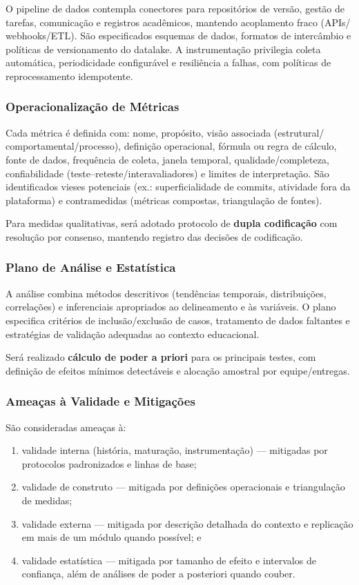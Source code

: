 \documentclass[12pt,a4paper]{article}
\begin{document}
O pipeline de dados contempla conectores para repositórios de versão, gestão de
tarefas, comunicação e registros acadêmicos, mantendo acoplamento fraco (APIs/
webhooks/ETL). São especificados esquemas de dados, formatos de intercâmbio e
políticas de versionamento do datalake. A instrumentação privilegia coleta
automática, periodicidade configurável e resiliência a falhas, com políticas de
reprocessamento idempotente.

\subsubsection{Operacionalização de Métricas}

Cada métrica é definida com: nome, propósito, visão associada (estrutural/
comportamental/processo), definição operacional, fórmula ou regra de cálculo,
fonte de dados, frequência de coleta, janela temporal, qualidade/completeza,
confiabilidade (teste–reteste/interavaliadores) e limites de interpretação.
São identificados vieses potenciais (ex.: superficialidade de commits,
atividade fora da plataforma) e contramedidas (métricas compostas, triangulação
de fontes).

Para medidas qualitativas, será adotado protocolo de \textbf{dupla codificação}
com resolução por consenso, mantendo registro das decisões de codificação.

\subsubsection{Plano de Análise e Estatística}

A análise combina métodos descritivos (tendências temporais, distribuições,
correlações) e inferenciais apropriados ao delineamento e às variáveis. O plano
especifica critérios de inclusão/exclusão de casos, tratamento de dados
faltantes e estratégias de validação adequadas ao contexto educacional.

Será realizado \textbf{cálculo de poder a priori} para os principais testes,
com definição de efeitos mínimos detectáveis e alocação amostral por
equipe/entregas.

\subsubsection{Ameaças à Validade e Mitigações}

São consideradas ameaças à:
\begin{enumerate}
  \item validade interna (história, maturação, instrumentação) — mitigadas por protocolos padronizados e linhas de base;
  \item validade de construto — mitigada por definições operacionais e triangulação de medidas;
  \item validade externa — mitigada por descrição detalhada do contexto e replicação em mais de um módulo quando possível; e
  \item validade estatística — mitigada por tamanho de efeito e intervalos de confiança, além de análises de poder a posteriori quando couber.
\end{enumerate}
\end{document}

